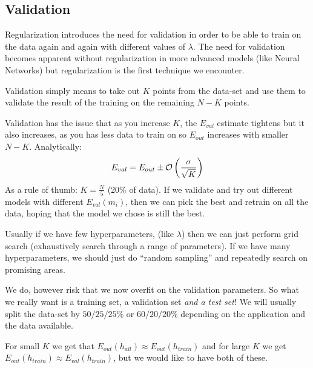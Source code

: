    \subsection{Validation}
    Regularization introduces the need for validation in order to be able to 
    train on the data again and again with different values of $\lambda$. The 
    need for validation becomes apparent without regularization in more 
    advanced models (like Neural Networks) but regularization is the first 
    technique we encounter.
    
    Validation simply means to take out $K$ points from the data-set and use 
    them to validate the result of the training on the remaining $N-K$ points.
    
    Validation has the issue that as you increase $K$, the $E_{val}$ estimate 
    tightens but it also increases, as you has less data to train on so 
    $E_{out}$ increases with smaller $N-K$. Analytically:
    \begin{equation*}
        E_{val} = E_{out} \pm \mathcal{O}\left(\frac{\sigma}{\sqrt{K}}\right)
    \end{equation*}
    As a rule of thumb: $K=\frac{N}{5}$ (20\% of data). If we validate and try 
    out different models with different $E_{val}(m_i)$, then we can pick the 
    best and retrain on all the data, hoping that the model we chose is still 
    the best.
    
    Usually if we have few hyperparameters, (like $\lambda$) then we can just 
    perform grid search (exhaustively search through a range of parameters). If 
    we have many hyperparameters, we should just do ``random sampling'' and 
    repeatedly search on promising areas.
    
    We do, however risk that we now overfit on the validation parameters. So 
    what we really want is a training set, a validation set \textit{and a test 
    set}! We will usually split the data-set by $50/25/25\%$ or $60/20/20\%$ 
    depending on the application and the data available.
    
    For small $K$ we get that $E_{out}(h_{all}) \approx E_{out}(h_{train})$ and 
    for large $K$ we get $E_{out}(h_{train}) \approx E_{val}(h_{train})$, but 
    we would like to have both of these.
    

